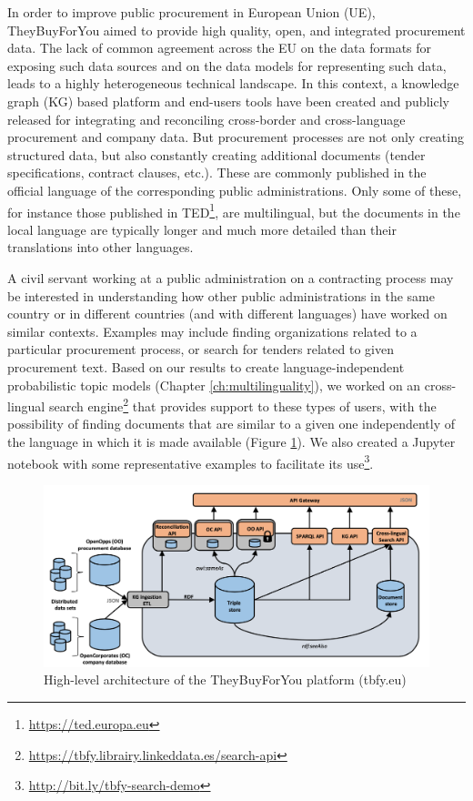 In order to improve public procurement in European Union (UE), TheyBuyForYou \citep{Ahmet2020} aimed to provide high quality, open, and integrated procurement data. The lack of common agreement across the EU on the data formats for exposing such data sources and on the data models for representing such data, leads to a highly heterogeneous technical landscape. In this context, a knowledge graph (KG) based platform and end-users tools have been created and publicly released for integrating and reconciling cross-border and cross-language procurement and company data. But procurement processes are not only creating structured data, but also constantly creating additional documents (tender specifications, contract clauses, etc.). These are commonly published in the official language of the corresponding public administrations. Only some of these, for instance those published in TED\footnote{\url{https://ted.europa.eu}}, are multilingual, but the documents in the local language are typically longer and much more detailed than their translations into other languages.

A civil servant working at a public administration on a contracting process may be interested in understanding how other public administrations in the same country or in different countries (and with different languages) have worked on similar contexts. Examples may include finding organizations related to a particular procurement process, or search for tenders related to given
procurement text. Based on our results to create language-independent probabilistic topic models (Chapter \ref{ch:multilinguality}), we worked on an cross-lingual search engine\footnote{\url{https://tbfy.librairy.linkeddata.es/search-api}} that provides support to these types of users, with the possibility of finding documents that are similar to a given one independently of the language in which it is made available (Figure \ref{fig:tbfy-architecture}). We also created a Jupyter notebook with some representative examples to facilitate its use\footnote{\url{http://bit.ly/tbfy-search-demo}}.

\begin{figure}[ht]
    \centering
    \includegraphics[width=0.7\linewidth]{tbfy-architecture.png}
    \caption{High-level architecture of the TheyBuyForYou platform (tbfy.eu)}
    \label{fig:tbfy-architecture}
\end{figure}

